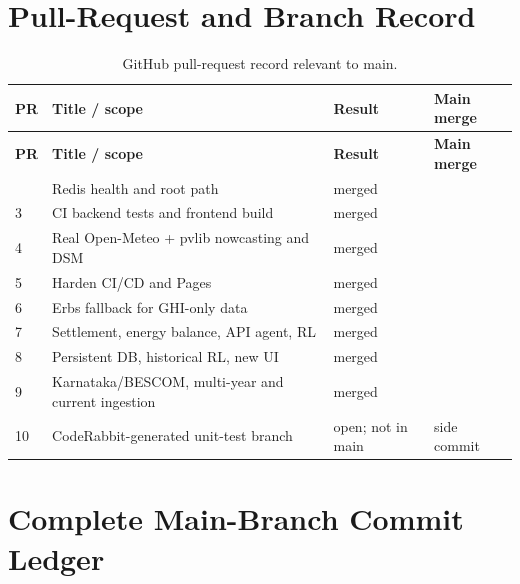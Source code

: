 \documentclass[10pt,a4paper]{article}
\begin{document}
\section{Pull-Request and Branch Record}

\begin{longtable}{@{}C{1.2cm}L{5.2cm}L{5.0cm}L{3.5cm}@{}}
\caption{GitHub pull-request record relevant to main.}\label{tab:prs}\\
\toprule
\textbf{PR} & \textbf{Title / scope} & \textbf{Result} & \textbf{Main merge}\\
\midrule
\endfirsthead
\toprule
\textbf{PR} & \textbf{Title / scope} & \textbf{Result} & \textbf{Main merge}\\
\midrule
\endhead
\bottomrule
{} & Redis health and root path & merged & \\
3 & CI backend tests and frontend build & merged & \\
4 & Real Open-Meteo + pvlib nowcasting and DSM & merged & \\
5 & Harden CI/CD and Pages & merged & \\
6 & Erbs fallback for GHI-only data & merged & \\
7 & Settlement, energy balance, API agent, RL & merged & \\
8 & Persistent DB, historical RL, new UI & merged & \\
9 & Karnataka/BESCOM, multi-year and current ingestion & merged & \\
10 & CodeRabbit-generated unit-test branch & open; not in main & side commit \\
\end{longtable}

\section{Complete Main-Branch Commit Ledger}
\end{document}
